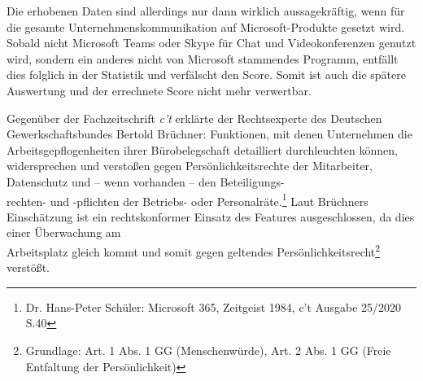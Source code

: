Die erhobenen Daten sind allerdings nur dann wirklich aussagekräftig, wenn für die gesamte Unternehmenskommunikation auf Microsoft-Produkte gesetzt wird. Sobald nicht Microsoft Teams oder Skype für Chat und Videokonferenzen genutzt wird, sondern ein anderes nicht von Microsoft stammendes Programm, entfällt dies folglich in der Statistik und verfälscht den Score. Somit ist auch die spätere Auswertung und der errechnete Score nicht mehr verwertbar.

Gegenüber der Fachzeitschrift \textit{c't} erklärte der Rechtsexperte des Deutschen Gewerkschaftsbundes Bertold Brüchner: \glqq Funktionen, mit denen Unternehmen die Arbeitsgepflogenheiten ihrer Bürobelegschaft detailliert durchleuchten können, widersprechen und verstoßen gegen Persönlichkeitsrechte der Mitarbeiter, Datenschutz und – wenn vorhanden – den Beteiligungs-\\
rechten- und -pflichten der Betriebs- oder Personalräte.\grqq{}\footnote{Dr. Hans-Peter Schüler: \glqq Microsoft 365, Zeitgeist 1984\grqq{}, c't Ausgabe 25/2020 S.40} Laut Brüchners Einschätzung ist ein rechtskonformer Einsatz des Features ausgeschlossen, da dies einer Überwachung am\\
Arbeitsplatz gleich kommt und somit gegen geltendes Persönlichkeitsrecht\footnote{Grundlage: Art. 1 Abs. 1 GG (Menschenwürde), Art. 2 Abs. 1 GG (Freie Entfaltung der Persönlichkeit)} verstößt.\\

\vfill
